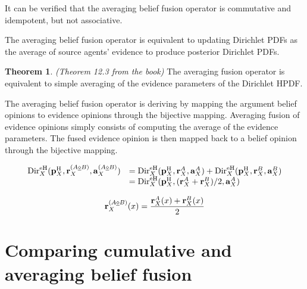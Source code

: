 \documentclass[a4paper,12pt]{article}
\theoremstyle{definition}
\theoremstyle{theorem}
\newtheorem{theorem}{Theorem}[section]
\numberwithin{equation}{section}
\begin{document}
It can be verified that the averaging belief fusion operator is commutative and idempotent, but not associative.

The averaging belief fusion operator is equivalent to updating Dirichlet PDFs as the average of source agents’ evidence to produce posterior Dirichlet PDFs.

\begin{theorem}
\emph{(Theorem 12.3 from the book)} The averaging fusion operator is equivalent to
simple averaging of the evidence parameters of the Dirichlet HPDF.
\end{theorem}

The averaging belief fusion operator is deriving by mapping the argument belief opinions to evidence opinions through the bijective mapping. Averaging fusion of evidence opinions simply consists of computing the average of the evidence parameters. The fused evidence opinion is then mapped back to a belief opinion through the bijective mapping.

\begin{equation}
\begin{array}{rl}
\mathrm{Dir}^{\mathrm{eH}}_X(\mathbf{p}^{\mathrm{H}}_X, \mathbf{r}^{(A \underline{\diamond} B)}_X, \mathbf{a}^{(A \underline{\diamond} B)}_X) & = \mathrm{Dir}^{\mathrm{eH}}_X(\mathbf{p}^{\mathrm{H}}_X, \mathbf{r}^{A}_X, \mathbf{a}^{A}_X) + \mathrm{Dir}^{\mathrm{eH}}_X(\mathbf{p}^{\mathrm{H}}_X, \mathbf{r}^{B}_X, \mathbf{a}^{B}_X) \\
& = \mathrm{Dir}^{\mathrm{eH}}_X(\mathbf{p}^{\mathrm{H}}_X, (\mathbf{r}^{A}_X + \mathbf{r}^{B }_X)/2, \mathbf{a}^{A}_X)
\end{array}
\end{equation}

\begin{equation}
\mathbf{r}^{(A \underline{\diamond} B)}_X(x) = \dfrac{\mathbf{r}^A_X(x) + \mathbf{r}^B_X(x)}{2}
\end{equation}


\section{Comparing cumulative and averaging belief fusion}
\end{document}
